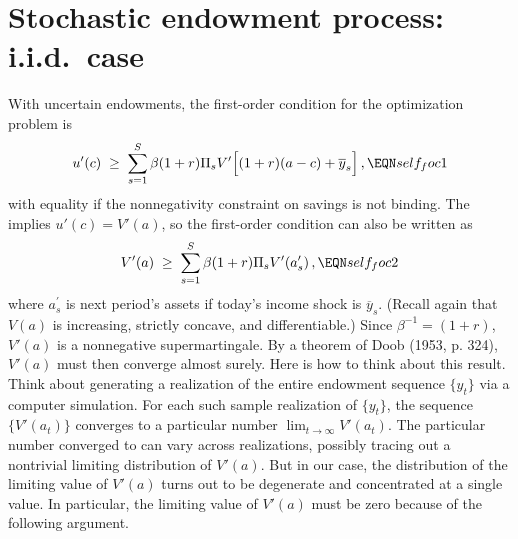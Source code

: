 \section{Stochastic endowment process: i.i.d.\ case}

With uncertain endowments, the first-order condition for the
optimization problem   is
\offparens
$$
u'(c) \;\geq\; \sum_{s=1}^S \beta (1+r) \Pi_s
            V'\Bigl[(1+r)(a-c) + \overline y_s \Bigr]\,,              \EQN self_foc1
$$
\autoparens
with equality if the nonnegativity constraint on savings is
not binding. The  implies $u'(c)=V'(a)$,
so the first-order condition can also be written as
$$
V'(a) \;\geq\; \sum_{s=1}^S \beta (1+r) \Pi_s
            V'(a^\prime_s)\,,                             \EQN self_foc2
$$
where $a^\prime_s$ is next period's assets if today's income shock
is $\overline y_s$. (Recall again that $V(a)$ is increasing, strictly concave, and differentiable.)
 Since $\beta^{-1}=(1+r)$, $V'(a)$ is a nonnegative
supermartingale.
By a theorem of Doob (1953, p. 324),
$V'(a)$ must then converge almost surely. Here is how to think about this result.  Think about generating a   realization of the entire endowment sequence $\{y_t\}$ via a computer simulation.
  For each such sample realization of $\{y_t\}$, the sequence  $\{V'(a_t)\}$ converges to a particular number $\lim_{t\rightarrow \infty} V'(a_t)$.
  The particular number converged to can vary across realizations, possibly tracing out a nontrivial limiting distribution of $V'(a)$.
  But in our case, the distribution of the limiting value of $V'(a)$ turns out to be degenerate and concentrated at a single value.
%
%
In particular, the limiting value of $V'(a)$ must be zero because of the following
argument. %
